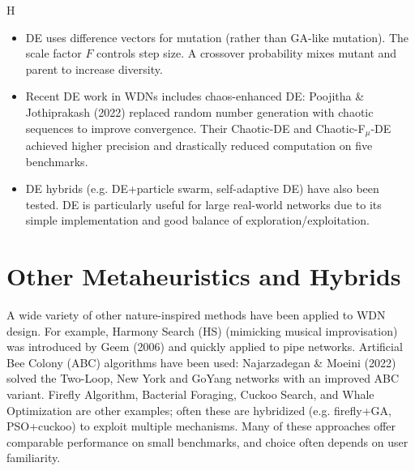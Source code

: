 H\documentclass[12pt, a4paper]{article}
\begin{document}
\begin{itemize}
    \item DE uses difference vectors for mutation (rather than GA-like mutation). The scale factor $F$ controls step size. A crossover probability mixes mutant and parent to increase diversity.
    \item Recent DE work in WDNs includes chaos-enhanced DE: Poojitha \& Jothiprakash (2022) replaced random number generation with chaotic sequences to improve convergence. Their Chaotic-DE and Chaotic-F$_\mu$-DE achieved higher precision and drastically reduced computation on five benchmarks\cite{ref8}.
    \item DE hybrids (e.g. DE+particle swarm, self-adaptive DE) have also been tested. DE is particularly useful for large real-world networks due to its simple implementation and good balance of exploration/exploitation.
\end{itemize}

\section*{Other Metaheuristics and Hybrids}
A wide variety of other nature-inspired methods have been applied to WDN design. For example, Harmony Search (HS) (mimicking musical improvisation) was introduced by Geem (2006) and quickly applied to pipe networks\cite{ref4}. Artificial Bee Colony (ABC) algorithms have been used: Najarzadegan \& Moeini (2022) solved the Two-Loop, New York and GoYang networks with an improved ABC variant\cite{ref9}. Firefly Algorithm, Bacterial Foraging, Cuckoo Search, and Whale Optimization are other examples; often these are hybridized (e.g. firefly+GA, PSO+cuckoo) to exploit multiple mechanisms\cite{ref10}. Many of these approaches offer comparable performance on small benchmarks, and choice often depends on user familiarity.
\end{document}
